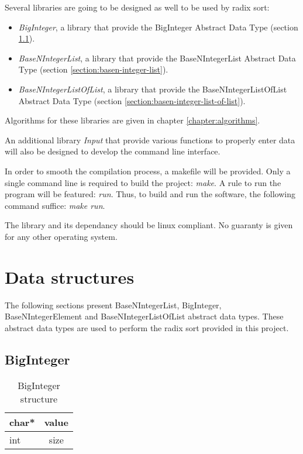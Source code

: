 \documentclass[book, nodocumentinfo]{upmethodology-document}
\begin{document}
Several libraries are going to be designed as well to be used by radix sort:
\begin{itemize}
    \item \emph{BigInteger}, a library that provide the
        BigInteger Abstract Data Type (section \ref{section:big-integer}).
    \item \emph{BaseNIntegerList}, a library that provide the
        BaseNIntegerList Abstract Data Type (section \ref{section:basen-integer-list}).
    \item \emph{BaseNIntegerListOfList}, a library that provide the
        BaseNIntegerListOfList Abstract Data Type (section \ref{section:basen-integer-list-of-list}).
\end{itemize}

Algorithms for these libraries are given in chapter \ref{chapter:algorithms}.

An additional library \emph{Input} that provide various functions to properly enter data will also be designed
to develop the command line interface.

In order to smooth the compilation process, a makefile will be provided.
Only a single command line is required to build the project: \emph{make}.
A rule to run the program will be featured: \emph{run}.
Thus, to build and run the software, the following command suffice: \emph{make run}.

The library and its dependancy should be linux compliant.
No guaranty is given for any other operating system.

\chapter{Data structures} \label{chapter:data-structures}

The following sections present BaseNIntegerList, BigInteger, BaseNIntegerElement and BaseNIntegerListOfList abstract data types.
These abstract data types are used to perform the radix sort provided in this project.

\section{BigInteger} \label{section:big-integer}

\begin{table}[h]
    \centering
    \label{tab:basenintegerelement-big-integer}

    \begin{tabular}{|l|c|}
        \hline
        char* & value \\
        \hline
        int & size \\
        \hline
    \end{tabular}

    \caption{BigInteger structure}
\end{table}
\end{document}
